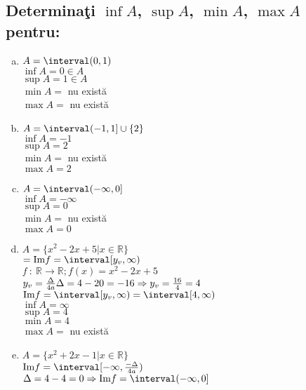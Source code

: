 \documentclass[a4paper, 12pt, notitlepage]{book}
\begin{document}
    \subsection{Determina\c{t}i $\inf A$, $\sup A$, $\min A$, $\max A$ pentru:}
    \begin{enumerate}[a.]
      \item $A = \interval({0,1})$\\
            $\inf A = 0 \in A$\\
            $\sup A = 1 \in A$\\
            $\min A =$ nu exist\u{a}\\
            $\max A =$ nu exist\u{a}

      \item $A = \interval({-1, 1}] \cup \{2\} $\\
            $\inf A = -1$\\
            $\sup A = 2$\\
            $\min A =$ nu exist\u{a}\\
            $\max A = 2$

      \item $A = \interval({-\infty, 0}]$\\
            $\inf A = -\infty$\\
            $\sup A = 0$\\
            $\min A =$ nu exist\u{a}\\
            $\max A = 0$

      \item $A = \{x^{2} - 2x +5 \vert x \in \mathbb{R}\}$\\
            $= \text{Im} f= \interval[{y_{v}, \infty})$\\
            $f\ :\ \mathbb{R} \to \mathbb{R}; f(x) = x^{2} - 2x +5$\\
            $y_{v} = \frac{\Delta}{4a}\\
            \Delta = 4-20 = -16 \Rightarrow y_{v} = \frac{16}{4} = 4$\\

            $\text{Im} f= \interval[{y_{v}, \infty}) = \interval[{4, \infty})$\\

            $\inf A = \infty$\\
            $\sup A = 4$\\
            $\min A = 4$ \\
            $\max A = $ nu exist\u{a}

      \item $A = \{x^{2} + 2x - 1 \vert x \in \mathbb{R}\}$\\
            $\text{Im} f= \interval[{-\infty, \frac{-\Delta}{4a}})$\\
            $\Delta = 4-4 = 0 \Rightarrow \text{Im} f= \interval({-\infty, 0}]$


\end{enumerate}
\end{document}
